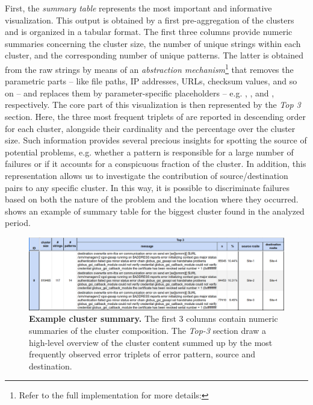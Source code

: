 First, the \textit{summary table} represents the most important and informative visualization.
This output is obtained by a first pre-aggregation of the clusters and is organized in a tabular format.
The first three columns provide numeric summaries concerning the  cluster size, the number of unique strings within each cluster, and the corresponding number of unique patterns.
The latter is obtained from the raw strings by means of an \textit{abstraction mechanism}\footnote{Refer to the full implementation for more details: \githubabstractions} that removes the parametric parts -- like file paths, IP addresses, URLs, checksum values, and so on -- and replaces them by parameter-specific placeholders -- e.g. , ,  and  , respectively.
The core part of this visualization is then represented by the \textit{Top 3} section. Here, the three most frequent triplets of  are reported in descending order for each cluster, alongside their cardinality and the percentage over the cluster size.
Such information provides several precious insights for spotting the source of potential problems, e.g. whether a pattern is responsible for a large number of failures or if it accounts for a conspicuous fraction of the cluster. 
In addition, this representation allows us to investigate the contribution of source/destination pairs to any specific cluster.
In this way, it is possible to discriminate failures based on both the nature of the problem and the location where they occurred.
 shows an example of summary table for the biggest cluster found in the analyzed period.

\begin{landscape}
    \begin{figure}
        \centering
        \includegraphics[width=\linewidth]{figures/410_method/cluster0_wide.png}
        \caption{ \textbf{Example cluster summary.}
        The first 3 columns contain numeric summaries of the cluster composition. The \textit{Top-3} section draw a high-level overview of the cluster content summed up by the most frequently observed error triplets of error pattern, source and destination.
        }
        \label{fig:cluster0}
    \end{figure}
\end{landscape}

